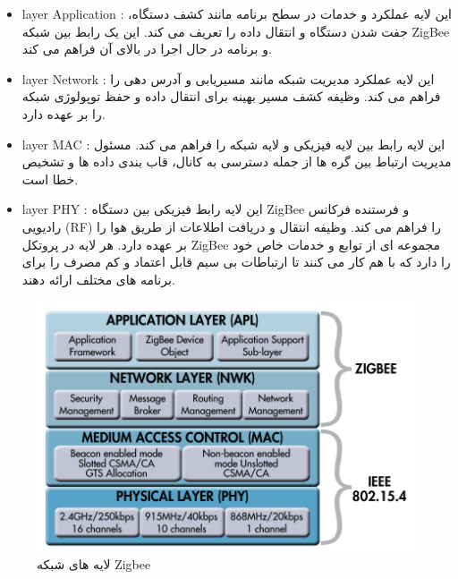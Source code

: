 \begin{itemize}
{    \begin{itemize}
        \item {
            layer Application 
            :
            این لایه عملکرد و خدمات در سطح برنامه مانند کشف دستگاه، جفت شدن دستگاه و انتقال داده را تعریف می کند. این یک رابط بین شبکه ZigBee و برنامه در حال اجرا در بالای آن فراهم می کند.
        }
        \item {
            layer Network 
            :
            این لایه عملکرد مدیریت شبکه مانند مسیریابی و آدرس دهی را فراهم می کند. وظیفه کشف مسیر بهینه برای انتقال داده و حفظ توپولوژی شبکه را بر عهده دارد.
        }
        \item {
            layer MAC   
            : 
            این لایه رابط بین لایه فیزیکی و لایه شبکه را فراهم می کند. مسئول مدیریت ارتباط بین گره ها از جمله دسترسی به کانال، قاب بندی داده ها و تشخیص خطا است.
            }
        \item {
            layer PHY  
            : 
            این لایه رابط فیزیکی بین دستگاه ZigBee و فرستنده فرکانس رادیویی (RF) را فراهم می کند. وظیفه انتقال و دریافت اطلاعات از طریق هوا را بر عهده دارد.
            هر لایه در پروتکل ZigBee مجموعه ای از توابع و خدمات خاص خود را دارد که با هم کار می کنند تا ارتباطات بی سیم قابل اعتماد و کم مصرف را برای برنامه های مختلف ارائه دهند.
            
            }
    \end{itemize}

    \begin{figure}[H]
        \centering
        \includegraphics[width=1\linewidth]{images/layers.jpg}
        \caption{ لایه های شبکه Zigbee }
        \label{fig:h}
    \end{figure}
}


\end{itemize}
